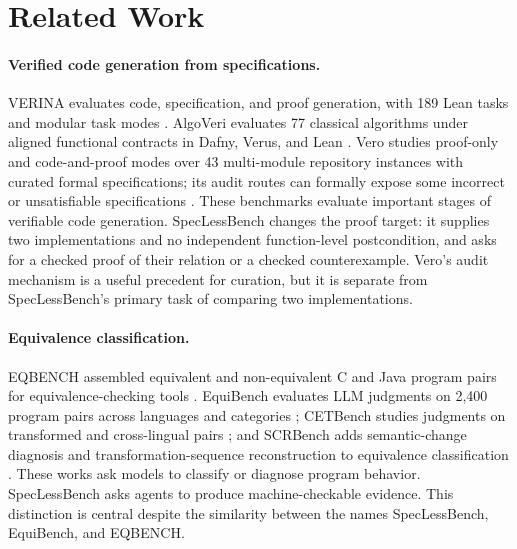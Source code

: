 \documentclass{article}
\begin{document}
\section{Related Work}

\paragraph{Verified code generation from specifications.}
VERINA evaluates code, specification, and proof generation, with 189 Lean tasks and modular task modes \citep{ye2026verina}. AlgoVeri evaluates 77 classical algorithms under aligned functional contracts in Dafny, Verus, and Lean \citep{zhao2026algoveri}. Vero studies proof-only and code-and-proof modes over 43 multi-module repository instances with curated formal specifications; its audit routes can formally expose some incorrect or unsatisfiable specifications \citep{ye2026vero}. These benchmarks evaluate important stages of verifiable code generation. SpecLessBench changes the proof target: it supplies two implementations and no independent function-level postcondition, and asks for a checked proof of their relation or a checked counterexample. Vero's audit mechanism is a useful precedent for curation, but it is separate from SpecLessBench's primary task of comparing two implementations.

\paragraph{Equivalence classification.}
EQBENCH assembled equivalent and non-equivalent C and Java program pairs for equivalence-checking tools \citep{badihi2021eqbench}. EquiBench evaluates LLM judgments on 2,400 program pairs across languages and categories \citep{wei2025equibench}; CETBench studies judgments on transformed and cross-lingual pairs \citep{oza2026cetbench}; and SCRBench adds semantic-change diagnosis and transformation-sequence reconstruction to equivalence classification \citep{saghatchian2026scrbench}. These works ask models to classify or diagnose program behavior. SpecLessBench asks agents to produce machine-checkable evidence. This distinction is central despite the similarity between the names SpecLessBench, EquiBench, and EQBENCH.
\end{document}
